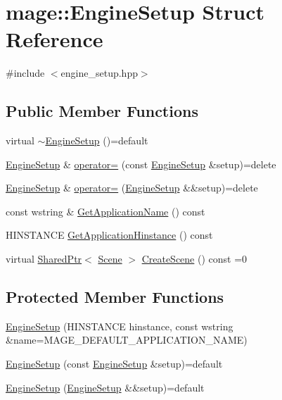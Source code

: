 \hypertarget{structmage_1_1_engine_setup}{}\section{mage\+:\+:Engine\+Setup Struct Reference}
\label{structmage_1_1_engine_setup}


{\ttfamily \#include $<$engine\+\_\+setup.\+hpp$>$}

\subsection*{Public Member Functions}
\begin{DoxyCompactItemize}
\item 
virtual \hyperlink{structmage_1_1_engine_setup_a77de1ad7e922dec4791b558d20616b08}{$\sim$\+Engine\+Setup} ()=default
\item 
\hyperlink{structmage_1_1_engine_setup}{Engine\+Setup} \& \hyperlink{structmage_1_1_engine_setup_ad7066882519b59ca533293f743334508}{operator=} (const \hyperlink{structmage_1_1_engine_setup}{Engine\+Setup} \&setup)=delete
\item 
\hyperlink{structmage_1_1_engine_setup}{Engine\+Setup} \& \hyperlink{structmage_1_1_engine_setup_a9ca25ff88af30786022964916790a497}{operator=} (\hyperlink{structmage_1_1_engine_setup}{Engine\+Setup} \&\&setup)=delete
\item 
const wstring \& \hyperlink{structmage_1_1_engine_setup_a63fed5e978c020ebc9d5080fe6fcefdc}{Get\+Application\+Name} () const
\item 
H\+I\+N\+S\+T\+A\+N\+CE \hyperlink{structmage_1_1_engine_setup_a2d9220896adfe924ac72165b4e2b13cf}{Get\+Application\+Hinstance} () const
\item 
virtual \hyperlink{namespacemage_a1e01ae66713838a7a67d30e44c67703e}{Shared\+Ptr}$<$ \hyperlink{classmage_1_1_scene}{Scene} $>$ \hyperlink{structmage_1_1_engine_setup_a004fce6a741fc68c8f6feed546d9f220}{Create\+Scene} () const =0
\end{DoxyCompactItemize}
\subsection*{Protected Member Functions}
\begin{DoxyCompactItemize}
\item 
\hyperlink{structmage_1_1_engine_setup_ac09a572abaf5f785004bb46a1d1bf49c}{Engine\+Setup} (H\+I\+N\+S\+T\+A\+N\+CE hinstance, const wstring \&name=M\+A\+G\+E\+\_\+\+D\+E\+F\+A\+U\+L\+T\+\_\+\+A\+P\+P\+L\+I\+C\+A\+T\+I\+O\+N\+\_\+\+N\+A\+ME)
\item 
\hyperlink{structmage_1_1_engine_setup_a40980f5fce1554c2a93707efdf4486a9}{Engine\+Setup} (const \hyperlink{structmage_1_1_engine_setup}{Engine\+Setup} \&setup)=default
\item 
\hyperlink{structmage_1_1_engine_setup_a6b150bbb4bff7971939a2f327ba760fe}{Engine\+Setup} (\hyperlink{structmage_1_1_engine_setup}{Engine\+Setup} \&\&setup)=default
\end{DoxyCompactItemize}
